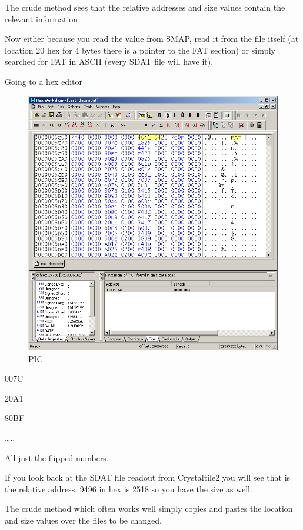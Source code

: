\documentclass[
]{book}
\begin{document}
The crude method sees that the relative addresses and size values contain the relevant information

Now either because you read the value from SMAP, read it from the file itself (at location 20 hex for 4 bytes there is a pointer to the FAT section) or simply searched for FAT in ASCII (every SDAT file will have it).

Going to a hex editor

\begin{figure}
\centering
\includegraphics{images/140_home_fast6191_romhackingguide_unrenamed_files_and_original_borders_relinkinghexworkshop1.png}
\caption{PIC}
\end{figure}

007C

20A1

80BF

\ldots..

All just the flipped numbers.

If you look back at the SDAT file readout from Crystaltile2 you will see that is the relative address. 9496 in hex is 2518 so you have the size as well.

The crude method which often works well simply copies and pastes the location and size values over the files to be changed.
\end{document}
